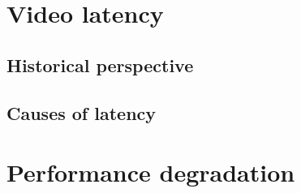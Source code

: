\section{Video latency}
\subsection{Historical perspective}
\subsection{Causes of latency}
\section{Performance degradation}
